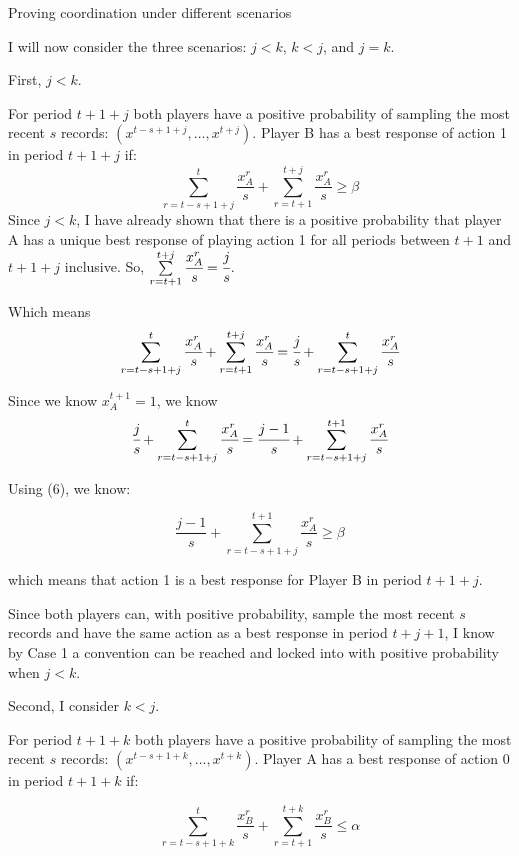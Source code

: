 \documentclass{article}
\begin{document}
\vskip12pt

\centering

Proving coordination under different scenarios

\vskip6pt

\raggedright

I will now consider the three scenarios: $j<k$, $k<j$, and $j=k$.

\vskip12pt

First, $j<k$. 

\vskip6pt

For period $t+1+j$ both players have a positive probability of sampling the most recent $s$ records: $(x^{t-s+1+j},...,x^{t+j})$. Player B has a best response of action 1 in period $t+1+j$ if:
$$\sum\limits_{r=t-s+1+j}^{t}\frac{x^r_A}{s}+\sum\limits_{r=t+1}^{t+j} \frac{x^r_A}{s} \geq \beta$$
Since $j<k$, I have already shown that there is a positive probability that player A has a unique best response of playing action 1 for all periods between $t+1$ and $t+1+j$ inclusive. So, $\sum\limits_{r=t+1}^{t+j} \cfrac{x^r_A}{s}=\cfrac{j}{s}$.

Which means 
$$\sum\limits_{r=t-s+1+j}^{t}\cfrac{x^r_A}{s}+\sum\limits_{r=t+1}^{t+j} \cfrac{x^r_A}{s}=\cfrac{j}{s}+\sum\limits_{r=t-s+1+j}^{t}\cfrac{x^r_A}{s}$$

Since we know $x^{t+1}_A = 1$, we know $$\cfrac{j}{s}+\sum\limits_{r=t-s+1+j}^{t}\cfrac{x^r_A}{s} = \cfrac{j-1}{s}+\sum\limits_{r=t-s+1+j}^{t+1}\cfrac{x^r_A}{s}$$

Using (6), we know:

$$\frac{j-1}{s}+\sum\limits_{r=t-s+1+j}^{t+1} \frac{x^r_A}{s} \geq \beta$$

which means that action 1 is a best response for Player B in period $t+1+j$.

\vskip6pt

Since both players can, with positive probability, sample the most recent $s$ records and have the same action as a best response in period $t+j+1$, I know by Case 1 a convention can be reached and locked into with positive probability when $j<k$.

\vskip18pt

Second, I consider $k<j$.

\vskip6pt

For period $t+1+k$ both players have a positive probability of sampling the most recent $s$ records: $(x^{t-s+1+k},...,x^{t+k})$. Player A has a best response of action 0 in period $t+1+k$ if:

$$\sum\limits_{r=t-s+1+k}^{t}\frac{x^r_B}{s}+\sum\limits_{r=t+1}^{t+k} \frac{x^r_B}{s} \leq \alpha$$
\end{document}

